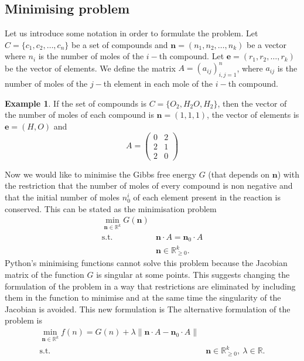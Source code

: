 \documentclass[a4paper,10pt]{article}
\newcommand{\bm}{\boldsymbol}
\newcommand{\mR}{{\mathbb R}}
\theoremstyle{plain}
\theoremstyle{definition}
\newtheorem{ex}{Example}[section]
\theoremstyle{remark}
\begin{document}
\subsection{Minimising problem}
Let us introduce some notation in order to formulate the problem. Let $C = \{c_1,c_2,\dots,c_n\} $ be a set of compounds and $\bm n=(n_1,n_2,\dots,n_k)$ be a vector where $n_i$ is the number of moles of the $i-$th compound. Let $\bm e= (r_1,r_2,\dots,r_k)$ be the vector of elements. We define the matrix $A=(a_{ij})_{i,j=1}^n$, where $a_{ij}$ is the number of moles of the $j-$th element in each mole of the $i-$th compound.
\begin{ex}
If the set of compounds is $C = \{O_2,H_2O,H_2\}$, then the vector of the number of moles of each compound is $\bm n=(1,1,1)$, the vector of elements is $\bm e = (H,O)$ and
\begin{equation*}
A = \begin{pmatrix}0&2\\ 2&1\\ 2&0
\end{pmatrix}
\end{equation*}
\end{ex}
Now we would like to minimise the Gibbs free energy $G$ (that depends on $\bm n$) with the restriction that the number of moles of every compound is non negative and that the initial number of moles $n_0^i$ of each element present in the reaction is conserved. This can be stated as the minimisation problem
\begin{equation*}
\begin{array}{ll}
\displaystyle\min_{\bm n\in\mR^k} G(\bm n)\\
\text{s.t.} & \bm n\cdot A = \bm n_0\cdot A\\
& \bm n\in\mR^k_{\geq0}.
\end{array}
\end{equation*}
Python's minimising functions cannot solve this problem because the Jacobian matrix of the function $G$ is singular at some points. This suggests changing the formulation of the problem in a way that restrictions are eliminated by including them in the function to minimise and at the same time the singularity of the Jacobian is avoided. This new formulation is
The alternative formulation of the problem is
\begin{equation*}
\begin{array}{ll}
\displaystyle\min_{\bm n\in\mR^k} f(n) = G(n) + \lambda \lVert \bm n\cdot A - \bm n_0\cdot A \lVert\\
\text{s.t.} & \bm n\in\mR^k_{\geq0}, \ \lambda\in\mR.
\end{array}
\end{equation*}
\end{document}
